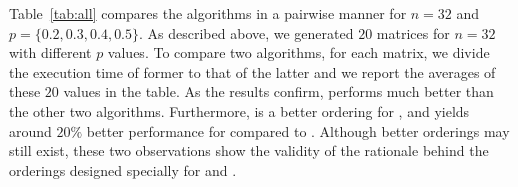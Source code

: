 \documentclass{elektr}
\begin{document}
{\begin{table}[!htbp]
\centering
{}
 \caption{Speedups of to {} over {} with different $n$ and $p$ values.}
 \label{tab:seq}
 \end{table}

Table~\ref{tab:all} compares the algorithms in a pairwise manner for $n = 32$ and $p = \{0.2, 0.3, 0.4, 0.5\}$. As described above, we generated $20$ matrices for $n = 32$ with different $p$ values. To compare two algorithms, for each matrix, we divide the execution time of former to that of the latter and we report the averages of these $20$ values in the table. As the results confirm, {} performs much better than the other two algorithms. Furthermore, {} is a better ordering for {}, and {} yields around $20\%$ better performance for {} compared to {}. Although better orderings may still exist, these two observations show the validity of the rationale behind the orderings designed specially for {} and {}. 

}
\end{document}
